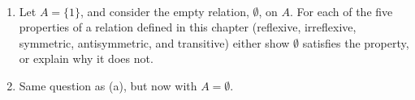 \begin{prob}
\ %
\begin{enumerate}[label=(\alph*)]
 \item  Let $A=\{1\}$, and consider the empty relation, $\emptyset$,  on $A$. 
 For each of the five properties of a relation defined in this chapter (reflexive, irreflexive, symmetric, antisymmetric, and transitive) 
either show $\emptyset$ satisfies the property, or explain why it does not.

 \item Same question as (a), but now with $A=\emptyset$.
\end{enumerate}
\end{prob}

